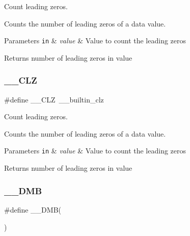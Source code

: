 Count leading zeros. 

Counts the number of leading zeros of a data value. 
\begin{DoxyParams}[1]{Parameters}
\mbox{\tt in}  & {\em value} & Value to count the leading zeros \\
\hline
\end{DoxyParams}
\begin{DoxyReturn}{Returns}
number of leading zeros in value 
\end{DoxyReturn}
\mbox{\label{group___c_m_s_i_s___core___instruction_interface_ga5d5bb1527e042be4a9fa5a33f65cc248}} 
\subsubsection{\texorpdfstring{\+\_\+\+\_\+\+C\+LZ}{\_\_CLZ}\hspace{0.1cm}{\footnotesize\ttfamily [3/3]}}
{\footnotesize\ttfamily \#define \+\_\+\+\_\+\+C\+LZ~\+\_\+\+\_\+builtin\+\_\+clz}



Count leading zeros. 

Counts the number of leading zeros of a data value. 
\begin{DoxyParams}[1]{Parameters}
\mbox{\tt in}  & {\em value} & Value to count the leading zeros \\
\hline
\end{DoxyParams}
\begin{DoxyReturn}{Returns}
number of leading zeros in value 
\end{DoxyReturn}
\mbox{\label{group___c_m_s_i_s___core___instruction_interface_ga671101179b5943990785f36f8c1e2269}} 
\subsubsection{\texorpdfstring{\+\_\+\+\_\+\+D\+MB}{\_\_DMB}\hspace{0.1cm}{\footnotesize\ttfamily [1/2]}}
{\footnotesize\ttfamily \#define \+\_\+\+\_\+\+D\+MB(\begin{DoxyParamCaption}{ }\end{DoxyParamCaption})}

